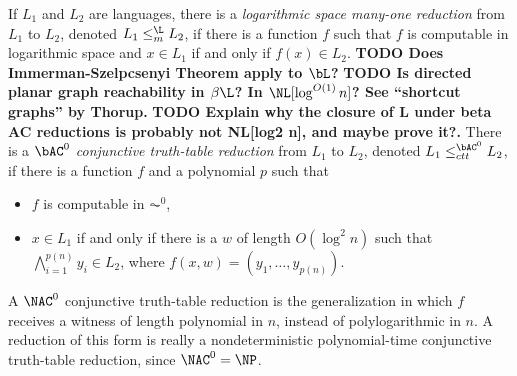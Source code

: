 \documentclass{article}
\newcommand{\todo}[1]{\textbf{TODO #1}}
\begin{document}
If $L_1$ and $L_2$ are languages, there is a \emph{logarithmic space many-one reduction} from $L_1$ to $L_2$, denoted $L_1 \leq_m^{\L} L_2$, if there is a function $f$ such that $f$ is computable in logarithmic space and $x \in L_1$ if and only if $f(x) \in L_2$.
\todo{Does Immerman-Szelpcsenyi Theorem apply to $\bL$?}
\todo{Is directed planar graph reachability in $\beta \L$? In $\NL[\log^{O(1)} n]$? See ``shortcut graphs'' by Thorup.}
\todo{Explain why the closure of L under beta AC reductions is probably not NL[log2 n], and maybe prove it?.}
There is a \emph{$\bAC^0$ conjunctive truth-table reduction} from $L_1$ to $L_2$, denoted $L_1 \leq^{\bAC^0}_{ctt} L_2$, if there is a function $f$ and a polynomial $p$ such that
\begin{itemize}
\item $f$ is computable in $\AC^0$,
\item $x \in L_1$ if and only if there is a $w$ of length $O(\log^2 n)$ such that $\bigwedge_{i = 1}^{p(n)} y_i \in L_2$, where $f(x, w) = (y_1, \dotsc, y_{p(n)})$.
\end{itemize}
A $\NAC^0$ conjunctive truth-table reduction is the generalization in which $f$ receives a witness of length polynomial in $n$, instead of polylogarithmic in $n$.
A reduction of this form is really a nondeterministic polynomial-time conjunctive truth-table reduction, since $\NAC^0 = \NP$.
\end{document}
